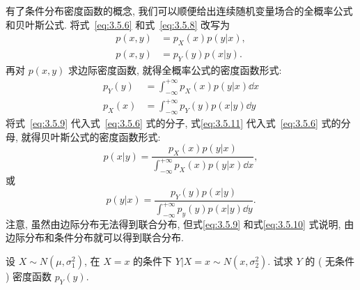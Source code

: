 	有了条件分布密度函数的概念,  我们可以顺便给出连续随机变量场合的全概率公式和贝叶斯公式. 将式~\ref{eq:3.5.6} 和式~\ref{eq:3.5.8} 改写为
	\begin{align}
		p(x,y)&=p_X(x)p(y|x),\label{eq:3.5.9}	\\
		p(x,y)&=p_Y(y)p(x|y). \label{eq:3.5.10}
	\end{align}
	再对 $p(x,y)$ 求边际密度函数, 就得全概率公式的密度函数形式:
	\begin{align}
		p_{Y}(y) &=\int_{-\infty}^{+\infty} p_{X}(x) p(y | x) \dd x\label{eq:3.5.11} \\
		p_{X}(x) &=\int_{-\infty}^{+\infty} p_{Y}(y) p(x | y) \dd y \label{eq:3.5.12}
	\end{align}
	将式~\ref{eq:3.5.9} 代入式~\ref{eq:3.5.6} 式的分子, 式\ref{eq:3.5.11} 代入式~\ref{eq:3.5.6} 式的分母, 
	就得贝叶斯公式的密度函数形式:
	\begin{equation}
		p(x | y)=\frac{p_{X}(x) p(y | x)}{\int_{-\infty}^{+\infty} p_{X}(x) p(y | x) \dd x},\label{eq:3.5.13}
	\end{equation}
	或
	\begin{equation}
		p(y | x)=\frac{p_{Y}(y) p(x | y)}{\int_{-\infty}^{+\infty} p_{y}(y) p(x | y) \dd y}.\label{eq:3.5.14}
	\end{equation}
	注意, 虽然由边际分布无法得到联合分布, 但式\ref{eq:3.5.9} 和式\ref{eq:3.5.10} 式说明, 由边际分布和条件分布就可以得到联合分布.
	\begin{example}\label{exam:3.5.6}
		设 $X\sim N(\mu,\sigma_1^2)$, 在 $X=x$ 的条件下 $Y|X=x\sim N(x,\sigma_2^2)$. 试求 $Y$ 的 ( 无条件 ) 密度函数 $p_Y(y)$.
	\end{example}
